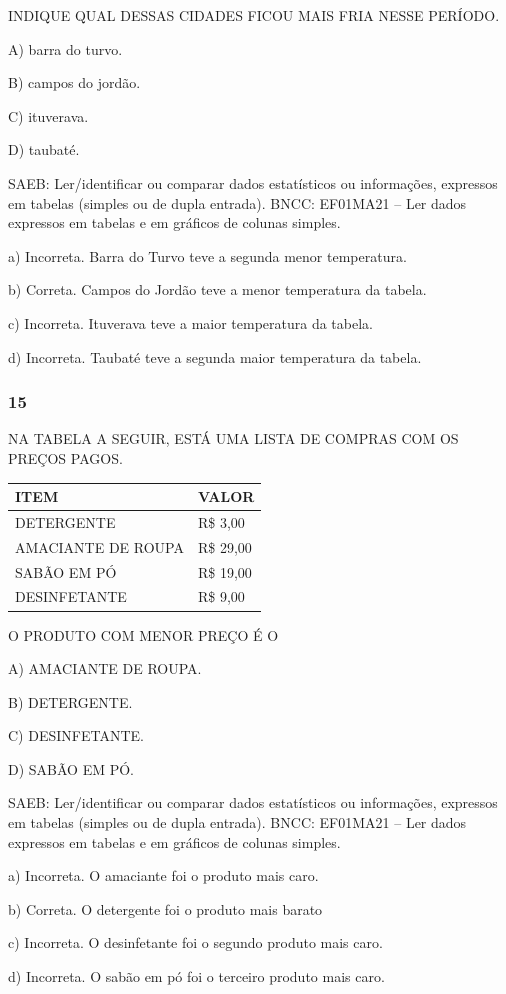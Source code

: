 INDIQUE QUAL DESSAS CIDADES FICOU MAIS FRIA NESSE PERÍODO.

A) barra do turvo.

B) campos do jordão.

C) ituverava.

D) taubaté.

SAEB: Ler/identificar ou comparar dados estatísticos ou
informações, expressos em tabelas (simples ou de dupla entrada).
BNCC: EF01MA21 -- Ler dados expressos em tabelas e em gráficos de colunas
simples.

a) Incorreta. Barra do Turvo teve a segunda menor temperatura.

b) Correta. Campos do Jordão teve a menor temperatura da tabela.

c) Incorreta. Ituverava teve a maior temperatura da tabela.

d) Incorreta. Taubaté teve a segunda maior temperatura da tabela.

\subsubsection{15}\label{section-101}

NA TABELA A SEGUIR, ESTÁ UMA LISTA DE COMPRAS COM OS PREÇOS PAGOS.

\begin{longtable}[]{@{}ll@{}}
\toprule
ITEM & VALOR\tabularnewline
\midrule
\endhead
DETERGENTE & R\$ 3,00\tabularnewline
AMACIANTE DE ROUPA & R\$ 29,00\tabularnewline
SABÃO EM PÓ & R\$ 19,00\tabularnewline
DESINFETANTE & R\$ 9,00\tabularnewline
\bottomrule
\end{longtable}

O PRODUTO COM MENOR PREÇO É O

A) AMACIANTE DE ROUPA.

B) DETERGENTE.

C) DESINFETANTE.

D) SABÃO EM PÓ.

SAEB: Ler/identificar ou comparar dados estatísticos ou
informações, expressos em tabelas (simples ou de dupla entrada).
BNCC: EF01MA21 -- Ler dados expressos em tabelas e em gráficos de colunas
simples.

a) Incorreta. O amaciante foi o produto mais caro.

b) Correta. O detergente foi o produto mais barato

c) Incorreta. O desinfetante foi o segundo produto mais caro.

d) Incorreta. O sabão em pó foi o terceiro produto mais caro.

